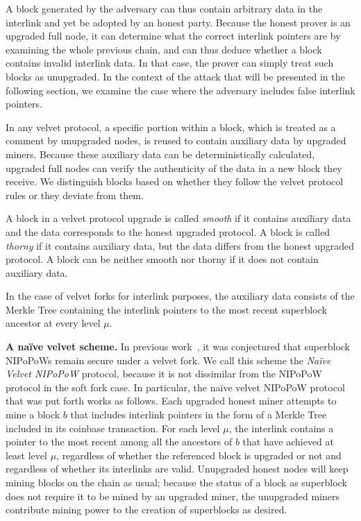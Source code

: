 A block generated by the adversary can thus contain arbitrary data in the
interlink and yet be adopted by an honest party. Because the honest prover is an
upgraded full node, it can determine what the correct interlink pointers are by
examining the whole previous chain, and can thus deduce whether a block contains
invalid interlink data. In that case, the prover can simply treat such blocks as
unupgraded. In the context of the attack that will be presented in the following
section, we examine the case where the adversary includes false interlink
pointers.

In any velvet protocol, a specific portion within a block, which is treated as
a comment by unupgraded nodes, is reused to contain auxiliary data by upgraded
miners. Because these auxiliary data can be deterministically calculated,
upgraded full nodes can verify the authenticity of the data in a new block they
receive. We distinguish blocks based on whether they follow the velvet protocol
rules or they deviate from them.

\begin{definition}
A block in a velvet protocol upgrade is called \emph{smooth} if it contains
auxiliary data and the data corresponds to the honest upgraded protocol. A block
is called \emph{thorny} if it contains auxiliary data, but the data differs from
the honest upgraded protocol. A block can be neither smooth nor thorny if it
does not contain auxiliary data.
\end{definition}

In the case of velvet forks for interlink purposes, the auxiliary data consists
of the Merkle Tree containing the interlink pointers to the most recent
superblock ancestor at every level $\mu$.

\noindent
\textbf{A na\"ive velvet scheme.}
In previous work~\cite{nipopows}, it was conjectured that superblock NIPoPoWs
remain secure under a velvet fork. We call this scheme the \emph{Na\"ive Velvet
NIPoPoW} protocol, because it is not dissimilar from the NIPoPoW protocol in the
soft fork case. In particular, the na\"ive velvet NIPoPoW protocol that was put
forth works as follows. Each upgraded honest miner attempts to mine a block $b$
that includes interlink pointers in the form of a Merkle Tree included in its
coinbase transaction. For each level $\mu$, the interlink contains a pointer to
the most recent among all the ancestors of $b$ that have achieved at least
level $\mu$, regardless of whether the referenced block is upgraded or not and
regardless of whether its interlinks are valid. Unupgraded honest nodes will
keep mining blocks on the chain as usual; because the status of a block as
superblock does not require it to be mined by an upgraded miner, the unupgraded
miners contribute mining power to the creation of superblocks as desired.

